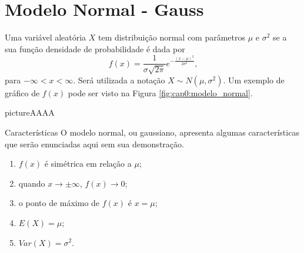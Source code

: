 \iffalse
\begin{exerciseInsideArea}
	\item Uma industria fabrica lâmpadas especiais que ficam em operação continuamente. A empresa oferece a seus clientes a garantia de reposição, caso a lâmpada dure menos de 50 horas. A vida útil dessas lâmpadas é modelada através da distribuição exponencial com parâmetro $\dfrac{1}{8.000}$. Determine
	
		\begin{enumerate}[label=(\alph*)]
			\item a porcentagem de trocas por defeito de fabricação;
			\item a duração média das lâmpadas;
			\item se a indústria fabrica 1.000 lâmpadas por semana, quantas dessas ela espera repor por semana;
			\item qual deve ser a garantia para que a indústria reponha no máximo 1\% de sua produção.
		\end{enumerate}
\end{exerciseInsideArea}
\fi

\section{Modelo Normal - Gauss}

Uma variável aleatória $X$ tem distribuição normal com parâmetros $\mu$ e $\sigma^2$ se a sua função densidade de probabilidade é dada por
\[
	f(x)=\frac{1}{\sigma\sqrt{2\pi}}e^{-\frac{(x-\mu)^2}{2\sigma^2}}
	\text{,}
\]
para $-\infty < x < \infty$. Será utilizada a notação $X\sim N(\mu,\sigma^2)$. Um exemplo de gráfico de $f(x)$ pode ser visto na Figura \ref{fig:cap0:modelo_normal}.

\begin{sidepicture}{2cm}{picture}{AAAA}
	\label{fig:cap0:modelo_normal}
\end{sidepicture}

\begin{note}{Características}
	O modelo normal, ou gaussiano, apresenta algumas características que serão enunciadas aqui sem sua demonstração.
	
	\begin{enumerate}[label=(\alph*)]
		\item $f(x)$ é simétrica em relação a $\mu$;
		\item quando $x\to\pm\infty$, $f(x)\to 0$;
		\item o ponto de máximo de $f(x)$ é $x=\mu$;
		\item $E(X)=\mu$;
		\item $Var(X)=\sigma^2$.
	\end{enumerate}
\end{note}


